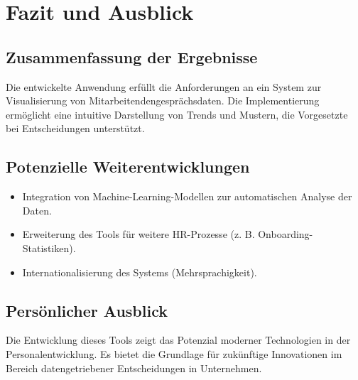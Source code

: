 \chapter{Fazit und Ausblick}
\label{chap:fazit}

\section{Zusammenfassung der Ergebnisse}
Die entwickelte Anwendung erfüllt die Anforderungen an ein System zur Visualisierung von Mitarbeitendengesprächsdaten. Die Implementierung ermöglicht eine intuitive Darstellung von Trends und Mustern, die Vorgesetzte bei Entscheidungen unterstützt.

\section{Potenzielle Weiterentwicklungen}
\begin{itemize}
    \item Integration von Machine-Learning-Modellen zur automatischen Analyse der Daten.
    \item Erweiterung des Tools für weitere HR-Prozesse (z. B. Onboarding-Statistiken).
    \item Internationalisierung des Systems (Mehrsprachigkeit).
\end{itemize}

\section{Persönlicher Ausblick}
Die Entwicklung dieses Tools zeigt das Potenzial moderner Technologien in der Personalentwicklung. Es bietet die Grundlage für zukünftige Innovationen im Bereich datengetriebener Entscheidungen in Unternehmen.